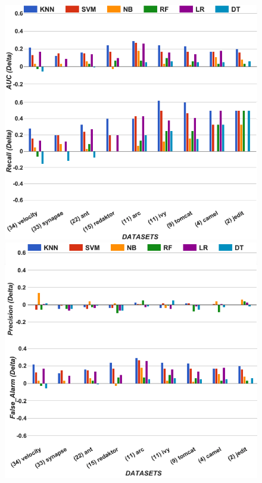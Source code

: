 \newcommand\fnote[1]{\captionsetup{font=small}\caption*{#1}}

\begin{figure}[!t]
\begin{minipage}{.5\linewidth}
\centering
        \includegraphics[width=.95\linewidth]{./fig/AUC_recall_untuned.png}
    \end{minipage}%
\begin{minipage}{.5\linewidth}
        \centering
        \includegraphics[width=.95\linewidth]{./fig/prec_pf_untuned.png}

\end{minipage}
\end{figure}
